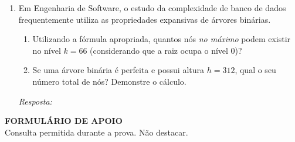 \documentclass[12pt,a4paper]{article}
\newcommand{\quadro}[1]{\vspace{0.2cm}\begin{tcolorbox}[colback=white, colframe=black, height=#1, boxrule=0.5pt, arc=0pt] \textit{Resposta:} \end{tcolorbox}}
\begin{document}
\begin{enumerate}
O TSP é um problema NP-difícil, uma vez que se encontra fora da classe P – para tamanhos de entrada muito grandes, os algoritmos conhecidos demandam tempo exponencial. Além disso, o TSP pertence à categoria dos problemas NP-completos em sua versão de decisão, e aqui a questão não é encontrar a rota mais curta, mas determinar se existe uma rota que não excede uma determinada distância $D$. A complexidade do TSP está no crescimento exponencial do número de rotas possíveis conforme o número de cidades aumenta: para $n$ cidades, existem $(n-1)!/2$ possíveis rotas, o que torna inviável uma solução exata por força bruta para grandes valores de $n$.

Com base no texto acima, o artigo menciona quatro complexidades computacionais associadas a diferentes algoritmos e problemas: o TSP por força bruta com $(n-1)!/2$ rotas, a busca clássica com $O(N)$, o algoritmo de Grover com $O(\sqrt{N})$ e o algoritmo de Shor com $O((\log N)^3)$.

Assinale a alternativa que classifica corretamente essas complexidades da \textbf{maior} (mais custosa) para a \textbf{menor} (mais eficiente):
\begin{enumerate}[label=\alph*)]
    \item $O(N)$ $>$ $O(\sqrt{N})$ $>$ $O((\log N)^3)$ $>$ $O(n!)$
    \item $O(n!)$ $>$ $O(N)$ $>$ $O((\log N)^3)$ $>$ $O(\sqrt{N})$
    \item $O(n!)$ $>$ $O(N)$ $>$ $O(\sqrt{N})$ $>$ $O((\log N)^3)$
    \item $O((\log N)^3)$ $>$ $O(\sqrt{N})$ $>$ $O(N)$ $>$ $O(n!)$
\end{enumerate}
\item Em Engenharia de Software, o estudo da complexidade de banco de dados frequentemente utiliza as propriedades expansivas de árvores binárias.

\begin{enumerate}[label=\alph*)]
    \item Utilizando a fórmula apropriada, quantos nós \textit{no máximo} podem existir no nível $k=66$ (considerando que a raiz ocupa o nível 0)?
    \item Se uma árvore binária é perfeita e possui altura $h=312$, qual o seu número total de nós? Demonstre o cálculo.
\end{enumerate}
\quadro{7cm}
\end{enumerate}

\newpage
\begin{center}
    {\Large \textbf{FORMULÁRIO DE APOIO}}\\[0.3cm]
    {\small Consulta permitida durante a prova. Não destacar.}
\end{center}
\vspace{0.5cm}
\end{document}
